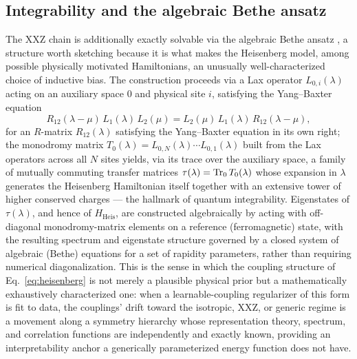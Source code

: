 \documentclass[11pt]{article}
\begin{document}
\subsection{Integrability and the algebraic Bethe ansatz}
The XXZ chain is additionally exactly solvable via the algebraic Bethe ansatz \cite{Franchini2017}, a structure worth sketching because it is what makes the Heisenberg model, among possible physically motivated Hamiltonians, an unusually well-characterized choice of inductive bias. The construction proceeds via a Lax operator $L_{0,i}(\lambda)$ acting on an auxiliary space $0$ and physical site $i$, satisfying the Yang--Baxter equation
\begin{equation}
R_{12}(\lambda-\mu)\,L_{1}(\lambda)\,L_{2}(\mu) = L_{2}(\mu)\,L_{1}(\lambda)\,R_{12}(\lambda-\mu),
\end{equation}
for an $R$-matrix $R_{12}(\lambda)$ satisfying the Yang--Baxter equation in its own right; the monodromy matrix $T_0(\lambda)=L_{0,N}(\lambda)\cdots L_{0,1}(\lambda)$ built from the Lax operators across all $N$ sites yields, via its trace over the auxiliary space, a family of mutually commuting transfer matrices $\tau(\lambda)=\Tr_0 T_0(\lambda)$ whose expansion in $\lambda$ generates the Heisenberg Hamiltonian itself together with an extensive tower of higher conserved charges — the hallmark of quantum integrability. Eigenstates of $\tau(\lambda)$, and hence of $H_{\text{Heis}}$, are constructed algebraically by acting with off-diagonal monodromy-matrix elements on a reference (ferromagnetic) state, with the resulting spectrum and eigenstate structure governed by a closed system of algebraic (Bethe) equations for a set of rapidity parameters, rather than requiring numerical diagonalization. This is the sense in which the coupling structure of Eq.~\eqref{eq:heisenberg} is not merely a plausible physical prior but a mathematically exhaustively characterized one: when a learnable-coupling regularizer of this form is fit to data, the couplings' drift toward the isotropic, XXZ, or generic regime is a movement along a symmetry hierarchy whose representation theory, spectrum, and correlation functions are independently and exactly known, providing an interpretability anchor a generically parameterized energy function does not have.
\end{document}
